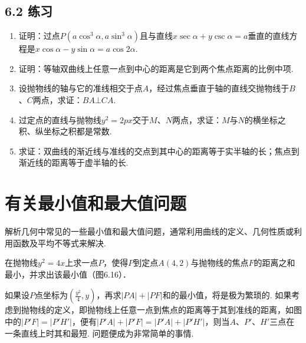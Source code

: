 \subsection*{6.2 练习}
\begin{enumerate}
\item 证明：过点$P(a\cos^3\alpha, a\sin^3\alpha)$且与直线$x\sec\alpha+y\csc\alpha=a$垂直的直线方程是$x\cos\alpha-y\sin\alpha=a\cos2\alpha$.
\item 证明：等轴双曲线上任意一点到中心的距离是它到两个焦点距离的比例中项.
\item 设抛物线的轴与它的准线相交于点$A$，经过焦点垂直于轴的直线交抛物线于$B$、$C$两点，求证：$BA\bot CA$.
\item 过定点的直线与抛物线$y^2=2px$交于$M$、$N$两点，求证：$M$与$N$的横坐标之积、纵坐标之积都是常数.
\item 求证：双曲线的渐近线与准线的交点到其中心的距离等于实半轴的长；焦点到渐近线的距离等于虚半轴的长.
\end{enumerate}

\section{有关最小值和最大值问题}
解析几何中常见的一些最小值和最大值问题，通常利用曲线的定义、几何性质或利用函数及平均不等式来解决.

\noindent
\begin{minipage}{.57\textwidth}
    \begin{example}
        在抛物线$y^2=4x$上求一点$P$，使得$P$到定点$A(4,2)$与抛物线的焦点$F$的距离之和最小，并求出该最小值（图6.16）．
    \end{example}

\begin{analyze}
如果设$P$点坐标为$\left(\frac{y^2}{4},y\right)$，再求$|PA|+|PF|$和的最小值，将是极为繁琐的. 如果考虑到抛物线的定义，即抛物线上任意一点到焦点的距离等于其到准线的距离，如图中的$|P'F|=|P'H'|$，便有$|P'A|+|P'F|=|P'A|+|P'H'|$，则当$A$、$P'$、$H'$三点在一条直线上时其和最短. 问题便成为非常简单的事情.
\end{analyze}

\end{minipage}\hfill
\begin{minipage}{.4\textwidth}
    \centering
{}    
\end{minipage}

